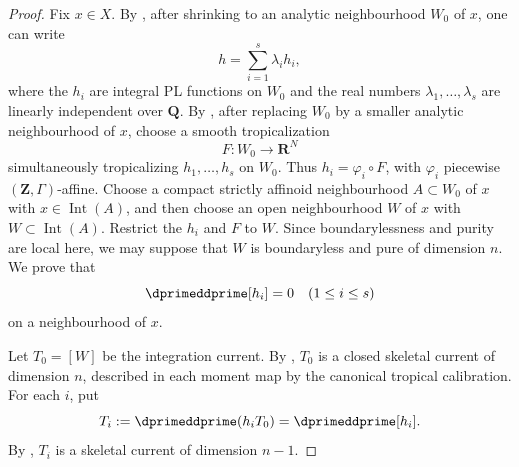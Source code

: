 \begin{proof}
Fix \(x\in X\).  By \cite[Proposition~5.8 and Lemma~5.10]{GJR26}, after
shrinking to an analytic neighbourhood \(W_0\) of \(x\), one can write
\begin{equation}
\label{eq:ch18-zero-current-independent}
                         h=\sum_{i=1}^{s}\lambda_i h_i,
\end{equation}
where the \(h_i\) are integral PL functions on \(W_0\) and the real numbers
\(\lambda_1,\ldots,\lambda_s\) are linearly independent over \(\mathbf Q\).
By \cite[Proposition~8.3 and \S8.4]{GJR26}, after replacing \(W_0\) by a
smaller analytic neighbourhood of \(x\), choose a smooth tropicalization
\[
                         F:W_0\longrightarrow\mathbf R^N
\]
simultaneously tropicalizing \(h_1,\ldots,h_s\) on \(W_0\).  Thus
\(h_i=\varphi_i\circ F\), with \(\varphi_i\) piecewise
\((\mathbf Z,\Gamma)\)-affine.  Choose a compact strictly affinoid
neighbourhood \(A\subset W_0\) of \(x\) with \(x\in\operatorname{Int}(A)\), and
then choose an open neighbourhood \(W\) of \(x\) with
\(W\subset\operatorname{Int}(A)\).  Restrict the \(h_i\) and \(F\) to \(W\).
Since boundarylessness and purity are local here, we may suppose that \(W\)
is boundaryless and pure of dimension \(n\).  We prove that
\begin{equation}
\label{eq:ch18-zero-current-integral}
                         \dprimeddprime[h_i]=0
                         \qquad(1\leq i\leq s)
\end{equation}
on a neighbourhood of \(x\).

Let \(T_0=[W]\) be the integration current.  By
\cite[Example~7.5.3]{CLD25}, \(T_0\) is a closed skeletal current of dimension
\(n\), described in each moment map by the canonical tropical calibration.
For each \(i\), put
\[
                         T_i:=\dprimeddprime(h_iT_0)
                             =\dprimeddprime[h_i].
\]
By \cite[Theorem~8.10.3]{CLD25}, \(T_i\) is a skeletal current of dimension
\(n-1\).


\end{proof}
